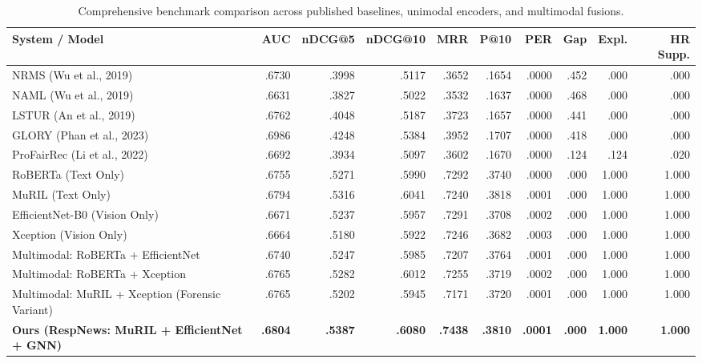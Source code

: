 \documentclass[conference]{IEEEtran}
\begin{document}
\begin{table}[t]
\caption{Comprehensive benchmark comparison across published baselines, unimodal encoders, and multimodal fusions.}
\label{tab:comparison}
\centering
\small
\setlength{\tabcolsep}{3.5pt}
\begin{tabular}{lrrrrrrrrr}
\hline
System / Model & AUC & nDCG@5 & nDCG@10 & MRR & P@10 & PER & Gap & Expl. & HR Supp.\\
\hline
NRMS (Wu et al., 2019) \cite{wu_nrms} & .6730 & .3998 & .5117 & .3652 & .1654 & .0000 & .452 & .000 & .000\\
NAML (Wu et al., 2019) \cite{wu_naml} & .6631 & .3827 & .5022 & .3532 & .1637 & .0000 & .468 & .000 & .000\\
LSTUR (An et al., 2019) \cite{an_lstur} & .6762 & .4048 & .5187 & .3723 & .1657 & .0000 & .441 & .000 & .000\\
GLORY (Phan et al., 2023) \cite{phan_glory} & .6986 & .4248 & .5384 & .3952 & .1707 & .0000 & .418 & .000 & .000\\
ProFairRec (Li et al., 2022) \cite{li_profai} & .6692 & .3934 & .5097 & .3602 & .1670 & .0000 & .124 & .124 & .020\\
\hline
RoBERTa (Text Only) \cite{liu_roberta} & .6755 & .5271 & .5990 & .7292 & .3740 & .0000 & .000 & 1.000 & 1.000\\
MuRIL (Text Only) \cite{khanuja_muril} & .6794 & .5316 & .6041 & .7240 & .3818 & .0001 & .000 & 1.000 & 1.000\\
EfficientNet-B0 (Vision Only) \cite{tan_efficientnet} & .6671 & .5237 & .5957 & .7291 & .3708 & .0002 & .000 & 1.000 & 1.000\\
Xception (Vision Only) \cite{chollet_xception} & .6664 & .5180 & .5922 & .7246 & .3682 & .0003 & .000 & 1.000 & 1.000\\
Multimodal: RoBERTa + EfficientNet & .6740 & .5247 & .5985 & .7207 & .3764 & .0001 & .000 & 1.000 & 1.000\\
Multimodal: RoBERTa + Xception & .6765 & .5282 & .6012 & .7255 & .3719 & .0002 & .000 & 1.000 & 1.000\\
Multimodal: MuRIL + Xception (Forensic Variant) & .6765 & .5202 & .5945 & .7171 & .3720 & .0001 & .000 & 1.000 & 1.000\\
\textbf{Ours (RespNews: MuRIL + EfficientNet + GNN)} & \textbf{.6804} & \textbf{.5387} & \textbf{.6080} & \textbf{.7438} & \textbf{.3810} & \textbf{.0001} & \textbf{.000} & \textbf{1.000} & \textbf{1.000}\\
\hline
\end{tabular}
\end{table}
\end{document}
